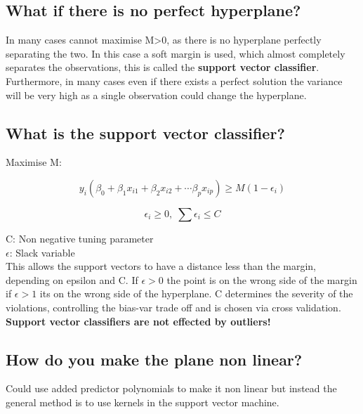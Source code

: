 \documentclass[11pt]{scrartcl} %
\begin{document}
\subsection{What if there is no perfect hyperplane?}

In many cases cannot maximise M>0, as there is no hyperplane perfectly separating the two.
In this case a soft margin is used, which almost completely separates the observations, this
is called the \textbf{support vector classifier}.\\

Furthermore, in many cases even if there exists a perfect solution the variance will be very high
as a single observation could change the hyperplane.

\subsection{What is the support vector classifier?}

Maximise M:

\begin{equation}
	y_i(\beta_0+\beta_1x_{i1}+\beta_2x_{i2}+\cdots \beta_px_{ip}) \geq M(1-\epsilon_i)
\end{equation}

\begin{equation}
	\epsilon_i \geq 0,\; \sum \epsilon_i \leq C
\end{equation}

C: Non negative tuning parameter\\
\(\epsilon\): Slack variable \\

This allows the support vectors to have a distance less than the margin, depending on epsilon and
C. If \(\epsilon>0\) the point is on the wrong side of the margin if \(\epsilon>1\) its on the wrong
side of the hyperplane. C determines the severity of the violations, controlling the bias-var
trade off and is chosen via cross validation.\\

\textbf{Support vector classifiers are not effected by outliers!}

\subsection{How do you make the plane non linear?}

Could use added predictor polynomials to make it non linear but instead the general method is to
use kernels in the support vector machine.
\end{document}
